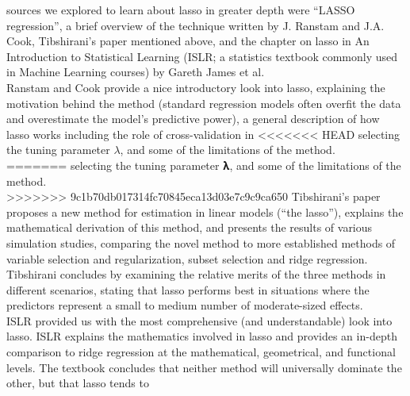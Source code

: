 \documentclass[
]{article}
\begin{document}
sources we explored to learn about lasso in greater depth were ``LASSO
regression'', a brief overview of the technique written by J. Ranstam
and J.A. Cook, Tibshirani's paper mentioned above, and the chapter on
lasso in An Introduction to Statistical Learning (ISLR; a statistics
textbook commonly used in Machine Learning courses) by Gareth James et
al.~\\
\hspace*{0.333em}\hspace*{0.333em}\hspace*{0.333em}\hspace*{0.333em}Ranstam
and Cook provide a nice introductory look into lasso, explaining the
motivation behind the method (standard regression models often overfit
the data and overestimate the model's predictive power), a general
description of how lasso works including the role of cross-validation in
<<<<<<< HEAD
selecting the tuning parameter \(\lambda\), and some of the limitations
of the method.\\
=======
selecting the tuning parameter 𝛌, and some of the limitations of the
method.\\
>>>>>>> 9c1b70db017314fc70845eca13d03e7c9c9ca650
\hspace*{0.333em}\hspace*{0.333em}\hspace*{0.333em}\hspace*{0.333em}Tibshirani's
paper proposes a new method for estimation in linear models (``the
lasso''), explains the mathematical derivation of this method, and
presents the results of various simulation studies, comparing the novel
method to more established methods of variable selection and
regularization, subset selection and ridge regression. Tibshirani
concludes by examining the relative merits of the three methods in
different scenarios, stating that lasso performs best in situations
where the predictors represent a small to medium number of
moderate-sized effects.\\
\hspace*{0.333em}\hspace*{0.333em}\hspace*{0.333em}\hspace*{0.333em}ISLR
provided us with the most comprehensive (and understandable) look into
lasso. ISLR explains the mathematics involved in lasso and provides an
in-depth comparison to ridge regression at the mathematical,
geometrical, and functional levels. The textbook concludes that neither
method will universally dominate the other, but that lasso tends to
\end{document}
